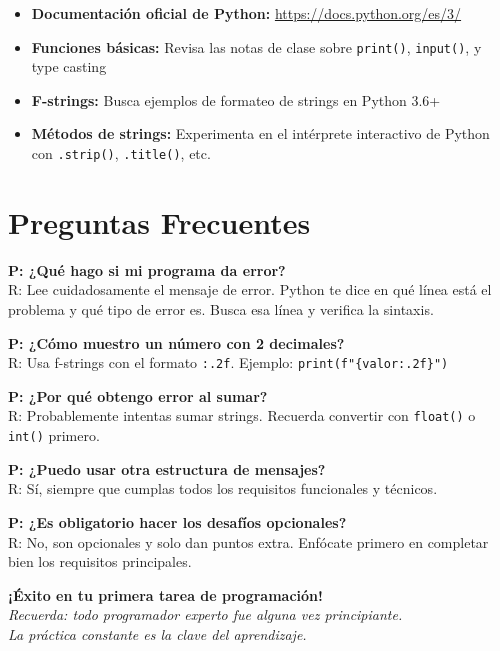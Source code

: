 \documentclass[12pt,a4paper]{article}
\begin{document}
\begin{itemize}[leftmargin=*]
    \item \textbf{Documentación oficial de Python:} \url{https://docs.python.org/es/3/}
    \item \textbf{Funciones básicas:} Revisa las notas de clase sobre \texttt{print()}, \texttt{input()}, y type casting
    \item \textbf{F-strings:} Busca ejemplos de formateo de strings en Python 3.6+
    \item \textbf{Métodos de strings:} Experimenta en el intérprete interactivo de Python con \texttt{.strip()}, \texttt{.title()}, etc.
\end{itemize}

\section{Preguntas Frecuentes}

\textbf{P: ¿Qué hago si mi programa da error?}\\
R: Lee cuidadosamente el mensaje de error. Python te dice en qué línea está el problema y qué tipo de error es. Busca esa línea y verifica la sintaxis.

\textbf{P: ¿Cómo muestro un número con 2 decimales?}\\
R: Usa f-strings con el formato \texttt{:.2f}. Ejemplo: \texttt{print(f"\{valor:.2f\}")}

\textbf{P: ¿Por qué obtengo error al sumar?}\\
R: Probablemente intentas sumar strings. Recuerda convertir con \texttt{float()} o \texttt{int()} primero.

\textbf{P: ¿Puedo usar otra estructura de mensajes?}\\
R: Sí, siempre que cumplas todos los requisitos funcionales y técnicos.

\textbf{P: ¿Es obligatorio hacer los desafíos opcionales?}\\
R: No, son opcionales y solo dan puntos extra. Enfócate primero en completar bien los requisitos principales.

\vspace{1cm}

\begin{center}
\textbf{¡Éxito en tu primera tarea de programación!}\\
\textit{Recuerda: todo programador experto fue alguna vez principiante.\\
La práctica constante es la clave del aprendizaje.}
\end{center}
\end{document}
